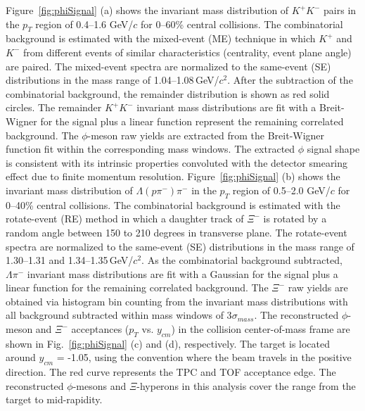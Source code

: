 \documentclass[%
 reprint,	
showpacs,
 amsmath,amssymb,
 aps,
 prc,
]{revtex4-1}
\begin{document}
Figure~\ref{fig:phiSignal} (a) shows the invariant mass distribution of $K^+K^-$ pairs in the $p_{T}$ region of 0.4--1.6 GeV/$c$ for 0--60\% central collisions. The combinatorial background is estimated with the mixed-event (ME) technique in which $K^+$ and $K^-$ from different events of similar characteristics (centrality, event plane angle) are paired. The mixed-event spectra are normalized to the same-event (SE) distributions in the mass range of 1.04--1.08\,GeV/$c^2$. After the subtraction of the combinatorial background, the remainder distribution is shown as red solid circles. The remainder $K^+K^-$ invariant mass distributions are fit with a Breit-Wigner for the signal plus a linear function represent the remaining correlated background. The $\phi$-meson raw yields are extracted from the Breit-Wigner function fit within the corresponding mass windows. The extracted $\phi$ signal shape is consistent with its intrinsic properties convoluted with the detector smearing effect due to finite momentum resolution.
Figure~\ref{fig:phiSignal} (b) shows the invariant mass distribution of $\Lambda(p\pi^-)\pi^-$ in the $p_{T}$ region of 0.5--2.0 GeV/$c$ for 0--40\% central collisions. The combinatorial background is estimated with the rotate-event (RE) method in which a daughter track of $\Xi^-$ is rotated by a random angle between 150 to 210 degrees in transverse plane. The rotate-event spectra are normalized to the same-event (SE) distributions in the mass range of 1.30--1.31 and 1.34--1.35\,GeV/$c^2$. As the combinatorial background subtracted, $\Lambda\pi^-$ invariant mass distributions are fit with a Gaussian for the signal plus a linear function for the remaining correlated background. The $\Xi^-$ raw yields are obtained via histogram bin counting from the invariant mass distributions with all background subtracted within mass windows of 3$\sigma_{mass}$. The reconstructed $\phi$-meson and $\Xi^-$ acceptances ($p_T$ vs. $y_{cm}$) in the collision center-of-mass frame are shown in Fig.~\ref{fig:phiSignal} (c) and (d), respectively.
The target is located around $y_{cm}$ = -1.05, using the convention where the beam travels in the positive direction. The red curve represents the TPC and TOF acceptance edge. The reconstructed $\phi$-mesons and $\Xi$-hyperons in this analysis cover the range from the target to mid-rapidity.
\end{document}
